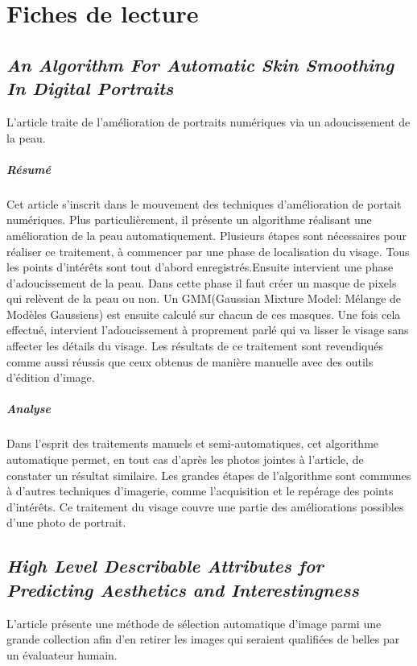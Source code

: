 \documentclass[11pt, french]{report-rd-info}
\begin{document}
\chapter{Fiches de lecture}
\label{ann:FichesLecture}

\section{\emph{An Algorithm For Automatic Skin Smoothing In Digital Portraits}}
L'article \cite{Lee} traite de l'amélioration de portraits numériques via un adoucissement de la peau.

\paragraph{Résumé}
Cet article s'inscrit dans le mouvement des techniques d'amélioration de portait numériques.
Plus particulièrement, il présente un algorithme réalisant une amélioration de la peau automatiquement.
Plusieurs étapes sont nécessaires pour réaliser ce traitement, à commencer par une phase de localisation du visage. 
Tous les points d'intérêts sont tout d'abord enregistrés.Ensuite intervient une phase d'adoucissement de la peau. 
Dans cette phase il faut créer un masque de pixels qui relèvent de la peau ou non. 
Un GMM(Gaussian Mixture Model: Mélange de Modèles Gaussiens) est ensuite calculé sur chacun de ces masques.
Une fois cela effectué, intervient l'adoucissement à proprement parlé qui va lisser le visage sans affecter les détails du visage.
Les résultats de ce traitement sont revendiqués comme aussi réussis que ceux obtenus de manière manuelle avec des outils d'édition d'image.

\paragraph{Analyse}
Dans l'esprit des traitements manuels et semi-automatiques, cet algorithme automatique permet, en tout cas d'après les photos jointes à l'article, de constater un résultat similaire.
Les grandes étapes de l'algorithme sont communes à d'autres techniques d'imagerie, comme l'acquisition et le repérage des points d'intérêts. 
Ce traitement du visage couvre une partie des améliorations possibles d'une photo de portrait.

\section{\emph{High Level Describable Attributes for Predicting Aesthetics and Interestingness}}
L'article \cite{Dhar}  présente une méthode de sélection automatique d'image parmi une grande collection afin d'en retirer les images qui seraient qualifiées de belles par un évaluateur humain.
\end{document}
